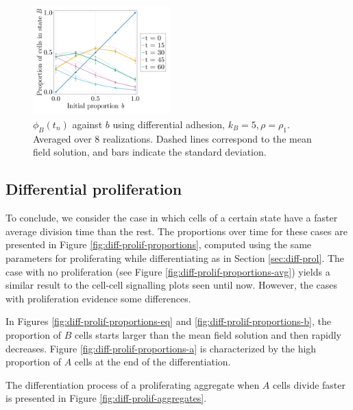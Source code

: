 \begin{figure}[h]
    \vspace{-6em}
    \centering
    \includegraphics[width=0.47\textwidth]{figures/410/410-adhesion-phib.png}
    \caption{$\phi_B(t_n)$ against $b$ using differential adhesion, $k_B=5, \rho=\rho_1$. Averaged over 8 realizations. Dashed lines correspond to the mean field solution, and bars indicate the standard deviation.}
    \label{fig:diff-adh-phib}
\end{figure}


\subsection{Differential proliferation}

To conclude, we consider the case in which cells of a certain state have a faster average division time than the rest. The proportions over time for these cases are presented in Figure \ref{fig:diff-prolif-proportions}, computed using the same parameters for proliferating while differentiating as in Section \ref{sec:diff-prol}. The case with no proliferation (see Figure \ref{fig:diff-prolif-proportions-avg}) yields a similar result to the cell-cell signalling plots seen until now. However, the cases with proliferation evidence some differences.

In Figures \ref{fig:diff-prolif-proportions-eq} and \ref{fig:diff-prolif-proportions-b}, the proportion of $B$ cells starts larger than the mean field solution and then rapidly decreases. Figure \ref{fig:diff-prolif-proportions-a} is characterized by the high proportion of $A$ cells at the end of the differentiation. 

The differentiation process of a proliferating aggregate when $A$ cells divide faster is presented in Figure \ref{fig:diff-prolif-aggregates}.


